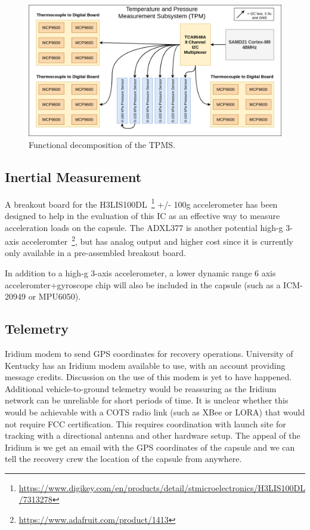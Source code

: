 \documentclass{article}
\begin{document}
\begin{figure}[h!]
	\centering
	\includegraphics[width=\textwidth]{images/amtps-temp-pressure-subsystem.png}
	\caption{Functional decomposition of the TPMS.}
	\label{fig:tpms-overview}
\end{figure}


\subsection{Inertial Measurement}
A breakout board for the H3LIS100DL~\footnote{\url{https://www.digikey.com/en/products/detail/stmicroelectronics/H3LIS100DL/7313278}} +/- 100g accelerometer has been designed to help in the evaluation of this IC as an effective way to measure acceleration loads on the capsule. The ADXL377 is another potential high-g 3-axis acceleromter~\footnote{\url{https://www.adafruit.com/product/1413}}, but has analog output and higher cost since it is currently only available in a pre-assembled breakout board.

In addition to a high-g 3-axis accelerometer, a lower dynamic range 6 axis acceleromter+gyroscope chip will also be included in the capsule (such as a ICM-20949 or MPU6050).

\subsection{Telemetry}

Iridium modem to send GPS coordinates for recovery operations. University of Kentucky has an Iridium modem available to use, with an account providing message credits. Discussion on the use of this modem is yet to have happened. Additional vehicle-to-ground telemetry would be reassuring as the Iridium network can be unreliable for short periods of time. It is unclear whether this would be achievable with a COTS radio link (such as XBee or LORA) that would not require FCC certification. This requires coordination with launch site for tracking with a directional antenna and other hardware setup. The appeal of the Iridium is we get an email with the GPS coordinates of the capsule and we can tell the recovery crew the location of the capsule from anywhere. 
\end{document}

